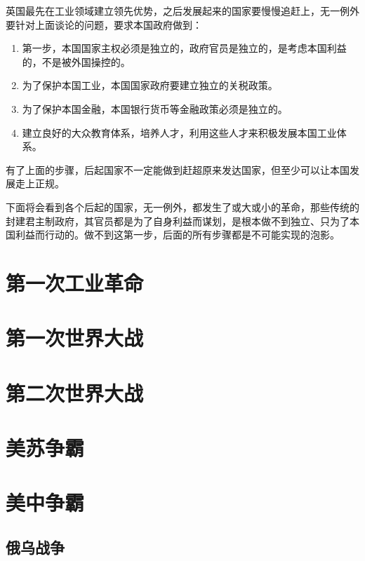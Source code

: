 \documentclass[12pt,oneside]{book}
\begin{document}
英国最先在工业领域建立领先优势，之后发展起来的国家要慢慢追赶上，无一例外要针对上面谈论的问题，要求本国政府做到：

\begin{enumerate}
\item 第一步，本国国家主权必须是独立的，政府官员是独立的，是考虑本国利益的，不是被外国操控的。
\item 为了保护本国工业，本国国家政府要建立独立的关税政策。
\item 为了保护本国金融，本国银行货币等金融政策必须是独立的。
\item 建立良好的大众教育体系，培养人才，利用这些人才来积极发展本国工业体系。
\end{enumerate}

有了上面的步骤，后起国家不一定能做到赶超原来发达国家，但至少可以让本国发展走上正规。

下面将会看到各个后起的国家，无一例外，都发生了或大或小的革命，那些传统的封建君主制政府，其官员都是为了自身利益而谋划，是根本做不到独立、只为了本国利益而行动的。做不到这第一步，后面的所有步骤都是不可能实现的泡影。



\chapter{第一次工业革命}





\chapter{第一次世界大战}


\chapter{第二次世界大战}


\chapter{美苏争霸}


\chapter{美中争霸}


\section{俄乌战争}
\end{document}
